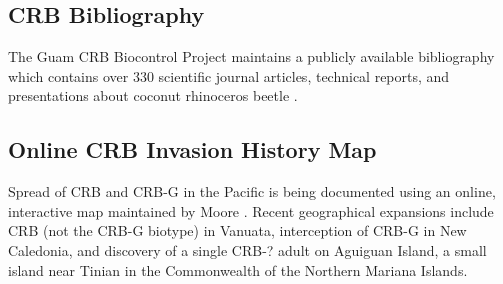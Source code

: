 \documentclass[12pt,letterpaper,english,bibliography=totocnumbered]{scrartcl}
\begin{document}
\subsection{CRB Bibliography}

The Guam CRB Biocontrol Project maintains a publicly available bibliography which contains over 330 scientific journal articles, technical reports, and presentations about coconut rhinoceros beetle \cite{moore_coconut_2019}.

\subsection{Online CRB Invasion History Map}

Spread of CRB and CRB-G in the Pacific is being documented using an online, interactive map maintained by Moore \cite{moore_web_2019}. Recent geographical expansions include CRB (not the CRB-G biotype) in Vanuata, interception of CRB-G in New Caledonia, and discovery of a single CRB-? adult on Aguiguan Island, a small island near Tinian in the Commonwealth of the Northern Mariana Islands.

\printbibliography
\end{document}
